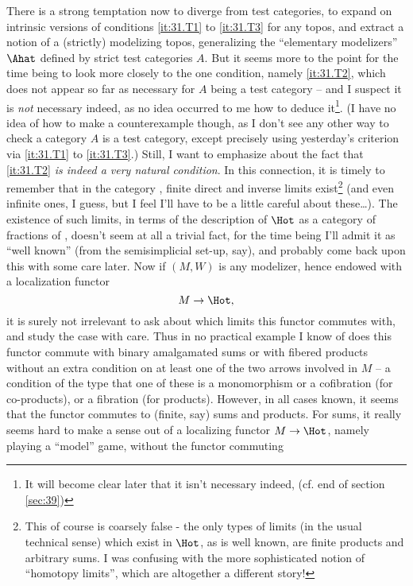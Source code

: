 There is a strong temptation now to diverge from test
categories, to expand on intrinsic versions of conditions
\ref{it:31.T1} to \ref{it:31.T3} for any topos, and extract a notion
of a (strictly) modelizing topos, generalizing the ``elementary
modelizers'' $\Ahat$ defined by strict test categories $A$. But
it seems more to the point for the time being to look more closely to
the one condition, namely \ref{it:31.T2}, which does not appear so far
as necessary for $A$ being a test category -- and I suspect it is
\emph{not} necessary indeed, as no idea occurred to me how to deduce
it\footnote{It will become clear later that it isn't necessary indeed, (cf. end of section \ref{sec:39})}. (I have no idea of how to make a counterexample though, as I don't
see any other way to check a category $A$ is a test category, except
precisely using yesterday's criterion via \ref{it:31.T1} to
\ref{it:31.T3}.) Still, I want to emphasize about the fact that
\ref{it:31.T2} \emph{is indeed a very natural condition}. In this connection,
it is timely to remember that in the category \Hot{}, finite direct and
inverse limits exist\footnote{This of course is coarsely false - the only types of limits (in the usual technical sense) which exist in $\Hot$, as is well known, are finite products and arbitrary sums. I was confusing with the more sophisticated notion of ``homotopy limits'', which are   altogether a different story!} (and even infinite ones, I guess, but I feel I'll
have to be a little careful about these\ldots). The existence of such
limits, in terms of the description of $\Hot$ as a category of fractions
of \Cat, doesn't seem at all a trivial fact, for the time being I'll
admit it as ``well known'' (from the semisimplicial set-up, say), and
probably come back upon this with some care later. Now if $(M,W)$ is
any modelizer, hence endowed with a localization functor
\[ M \to \Hot,\]
it is surely not irrelevant to ask about which limits this functor
commutes with, and study the case with care. Thus in no practical
example I know of does this functor commute with binary amalgamated
sums or with fibered products without an extra condition on at least
one of the two arrows involved in $M$ -- a condition of the type that
one of these is a monomorphism or a cofibration (for co-products), or
a fibration (for products). However, in all cases known, it seems that
the functor commutes to (finite, say) sums and products. For sums, it
really seems hard to make a sense out of a localizing functor $M\to
\Hot$, namely playing a ``model'' game, without the functor commuting
